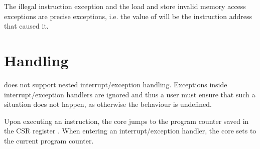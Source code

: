 The illegal instruction exception and the load and store invalid memory access
exceptions are precise exceptions, i.e. the value of  will be the
instruction address that caused it.

\section{Handling}

\rvcore does not support nested interrupt/exception handling. Exceptions inside
interrupt/exception handlers are ignored and thus a user must ensure that such
a situation does not happen, as otherwise the behaviour is undefined.

Upon executing an  instruction, the core jumps to the program
counter saved in the CSR register . When entering an
interrupt/exception handler, the core sets  to the current program
counter.
